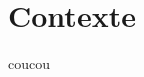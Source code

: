 \thispagestyle{empty}\cleardoublepage
\titleformat{\chapter}[display]
		{\normalfont\huge\bfseries}{}{20pt}{\Huge}
\chapter{Contexte}

coucou~\cite{sarazin:4214}
